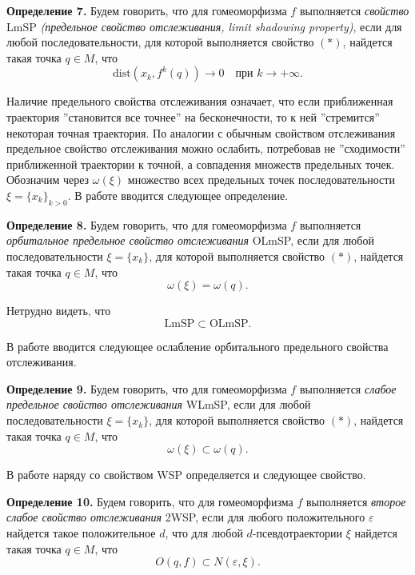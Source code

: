 \documentclass[12pt]{article}
\begin{document}
\textbf{Определение 7.} Будем говорить, что для гомеоморфизма $f$ выполняется \textit{свойство} LmSP \textit{(предельное свойство отслеживания, limit shadowing property)}, если для любой последовательности, для которой выполняется свойство $(*)$, найдется такая точка $q\in M$, что
$$\mbox{dist}(x_k,f^k(q))\longrightarrow0\quad\mbox{при }k\rightarrow+\infty.$$ 

Наличие предельного свойства отслеживания означает, что если приближенная траектория ''становится все точнее'' на бесконечности, то к ней ''стремится'' некоторая точная траектория. По аналогии с обычным свойством отслеживания предельное свойство отслеживания можно ослабить, потребовав не ''сходимости'' приближенной траектории к точной, а совпадения множеств предельных точек. Обозначим через  $\omega(\xi)$ множество всех предельных точек последовательности $\xi=\{x_k\}_{k>0}$. %
В работе \cite{8} вводится следующее определение.  

\textbf{Определение 8.} Будем говорить, что для гомеоморфизма $f$ выполняется \textit{орбитальное предельное свойство отслеживания} OLmSP, если для любой последовательности $\xi\!=\!\{x_k\}$, для которой выполняется свойство $(*)$, найдется такая точка $q\in\! M$, что
 $$\omega(\xi)=\omega(q).$$
 
Нетрудно видеть, что $$\mbox{LmSP}\subset\mbox{OLmSP}.$$

В работе \cite{8} вводится следующее ослабление орбитального предельного свойства отслеживания.

\textbf{Определение 9.}
 Будем говорить, что для гомеоморфизма $f$ выполняется \textit{слабое предельное свойс\-тво отслеживания} WLmSP, если для любой последовательности $\xi\!=\!\{x_k\}$, для которой выполняется свойство $(*)$, найдется такая точка $q\in\! M$, что 
\begin{equation}
\label{0.3}
\omega(\xi)\subset\omega(q).
\end{equation}

В работе \cite{3} наряду со свойством WSP определяется и следующее свойство. 

\textbf{Определение 10.}
 Будем говорить, что для гомеоморфизма $f$ выполняется \textit{второе слабое свойство отслеживания} 2WSP, если для любого положительного $\varepsilon$ найдется такое положительное $d$, что для любой $d$-псевдотраектории $\xi$ найдется такая точка $q\in\! M$, что $$O(q,f)\subset N(\varepsilon,\xi).$$
\end{document}
